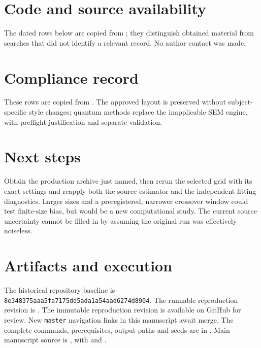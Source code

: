\section{Code and source availability}
The dated rows below are copied from ; they distinguish obtained material from searches that did not identify a relevant record. No author contact was made.


\section{Compliance record}
These rows are copied from . The approved layout is preserved without subject-specific style changes; quantum methods replace the inapplicable SEM engine, with preflight justification and separate validation.


\section{Next steps}
Obtain the production archive just named, then rerun the selected grid with its exact settings and reapply both the source estimator and the independent fitting diagnostics. Larger sizes and a preregistered, narrower crossover window could test finite-size bias, but would be a new computational study. The current source uncertainty cannot be filled in by assuming the original run was effectively noiseless.




\appendix
\section{Artifacts and execution}
The historical repository baseline is \texttt{8e348375aaa5fa7175dd5ada1a54aad6274d8904}. The runnable reproduction revision is \ReproductionRevision. The immutable reproduction revision is available on GitHub for review. New \texttt{master} navigation links in this manuscript await merge. The complete commands, prerequisites, output paths and seeds are in . Main manuscript source is , with  and .

